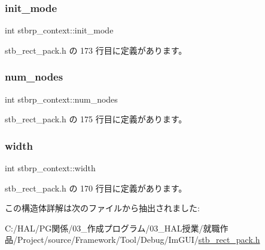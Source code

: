 \subsubsection{\texorpdfstring{init\+\_\+mode}{init\_mode}}
{\footnotesize\ttfamily int stbrp\+\_\+context\+::init\+\_\+mode}



 stb\+\_\+rect\+\_\+pack.\+h の 173 行目に定義があります。

\mbox{\label{structstbrp__context_afa8105d4ef6d3e0ae5aaf8e1ed4b2c58}} 
\subsubsection{\texorpdfstring{num\+\_\+nodes}{num\_nodes}}
{\footnotesize\ttfamily int stbrp\+\_\+context\+::num\+\_\+nodes}



 stb\+\_\+rect\+\_\+pack.\+h の 175 行目に定義があります。

\mbox{\label{structstbrp__context_a70cfcb2044ce8397cc440d28b30c09b2}} 
\subsubsection{\texorpdfstring{width}{width}}
{\footnotesize\ttfamily int stbrp\+\_\+context\+::width}



 stb\+\_\+rect\+\_\+pack.\+h の 170 行目に定義があります。



この構造体詳解は次のファイルから抽出されました\+:\begin{DoxyCompactItemize}
\item 
C\+:/\+H\+A\+L/\+P\+G関係/03\+\_\+作成プログラム/03\+\_\+\+H\+A\+L授業/就職作品/\+Project/source/\+Framework/\+Tool/\+Debug/\+Im\+G\+U\+I/\mbox{\hyperlink{stb__rect__pack_8h}{stb\+\_\+rect\+\_\+pack.\+h}}\end{DoxyCompactItemize}
